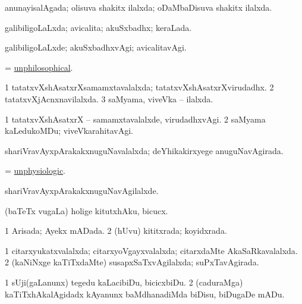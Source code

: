 \bentry
{} 
\gl{\gu}
\expl{}
\bmng
anunayisalAgada; olisuva shakitx ilalxda; oDaMbaDisuva shakitx ilalxda. 
\emng
\eentry

\bentry
{} 
\gl{\gu}
\expl{}
\bmng
galibiligoLaLxda; avicalita; akuSxbadhx; keraLada. 
\emng
\eentry

\bentry
{} 
\gl{\kirxvi}
\expl{}
\bmng
galibiligoLaLxde; akuSxbadhxvAgi; avicalitavAgi. 
\emng
\eentry

\bentry
{} 
\gl{\gu}
\expl{}
\bmng
= \hyperlink{unphilosophical}{unphilosophical}. 
\emng
\eentry

\bentry
{} 
\gl{\gu}
\expl{}
\bmng
\bnum
\num{1} tatatxvXshAsatxrXsamamxtavalalxda; tatatxvXshAsatxrXvirudadhx. 
\num{2} tatatxvXjAcnxnavilalxda. 
\num{3} saMyama, viveVka -- ilalxda. 
\enum
\emng
\eentry

\bentry
{} 
\gl{\kirxvi}
\expl{}
\bmng
\bnum
\num{1} tatatxvXshAsatxrX -- samamxtavalalxde, virudadhxvAgi. 
\num{2} saMyama kaLedukoMDu; viveVkarahitavAgi. 
\enum
\emng
\eentry

\bentry
{} 
\gl{\gu}
\expl{}
\bmng
shariVravAyxpArakakxnuguNavalalxda; deYhikakirxyege anuguNavAgirada. 
\emng
\eentry

\bentry
{} 
\gl{\gu}
\expl{}
\bmng
= \hyperlink{unphysiologic}{unphysiologic}. 
\emng
\eentry

\bentry
{} 
\gl{\kirxvi}
\expl{}
\bmng
shariVravAyxpArakakxnuguNavAgilalxde. 
\emng
\eentry

\bentry
{} 
\gl{\akirx}
\expl{}
\bmng
(baTeTx \mo vugaLa) holige kitutxhAku, bicucx. 
\emng
\eentry

\bentry
{} 
\gl{\gu}
\expl{}
\bmng
\bnum
\num{1} Arisada; Ayekx mADada. 
\num{2} (hUvu) kititxrada; koyidxrada. 
\enum
\emng
\eentry

\bentry
{} 
\gl{\gu}
\expl{}
\bmng
\bnum
\num{1} citarxyukatxvalalxda; citarxyoVgayxvalalxda; citarxdaMte AkaSaRkavalalxda. 
\num{2} (kaNiNxge kaTiTxdaMte) susapxSaTxvAgilalxda; suPxTavAgirada. 
\enum
\emng
\eentry

\bentry
{} 
\gl{\akirx}
\bmng
\bnum
\num{1} sUji(gaLanunx) tegedu kaLacibiDu, bicicxbiDu. 
\num{2} (caduraMga) kaTiTxhAkalAgidadx kAyanunx baMdhanadiMda biDisu, biDugaDe mADu. 
\enum
\emng
\eentry

